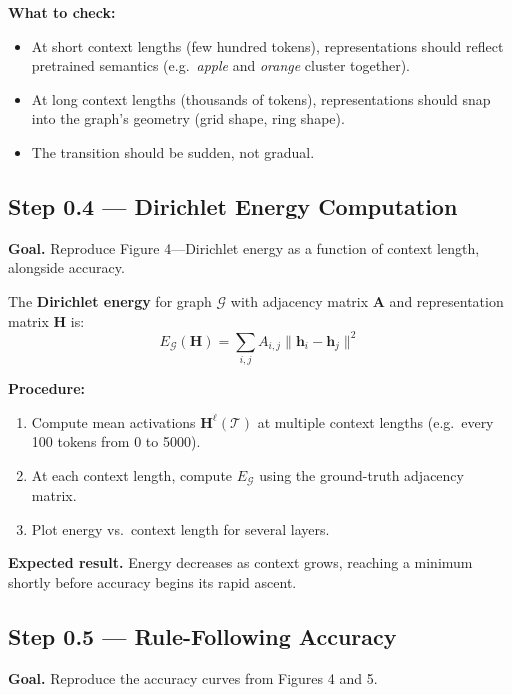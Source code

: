 \documentclass[11pt]{article}
\newcommand{\vH}{\mathbf{H}}
\newcommand{\vh}{\mathbf{h}}
\newcommand{\vA}{\mathbf{A}}
\newcommand{\cG}{\mathcal{G}}
\newcommand{\cT}{\mathcal{T}}
\begin{document}
\textbf{What to check:}
\begin{itemize}
    \item At short context lengths (few hundred tokens), representations should reflect pretrained semantics (e.g.\ \emph{apple} and \emph{orange} cluster together).
    \item At long context lengths (thousands of tokens), representations should snap into the graph's geometry (grid shape, ring shape).
    \item The transition should be sudden, not gradual.
\end{itemize}

\subsection{Step 0.4 --- Dirichlet Energy Computation}

\textbf{Goal.} Reproduce Figure 4---Dirichlet energy as a function of context length, alongside accuracy.

The \textbf{Dirichlet energy} for graph $\cG$ with adjacency matrix $\vA$ and representation matrix $\vH$ is:
\begin{equation}
    E_\cG(\vH) = \sum_{i,j} A_{i,j} \| \vh_i - \vh_j \|^2
    \label{eq:dirichlet}
\end{equation}

\textbf{Procedure:}
\begin{enumerate}
    \item Compute mean activations $\vH^\ell(\cT)$ at multiple context lengths (e.g.\ every 100 tokens from 0 to 5000).
    \item At each context length, compute $E_\cG$ using the ground-truth adjacency matrix.
    \item Plot energy vs.\ context length for several layers.
\end{enumerate}

\textbf{Expected result.} Energy decreases as context grows, reaching a minimum shortly before accuracy begins its rapid ascent.

\subsection{Step 0.5 --- Rule-Following Accuracy}

\textbf{Goal.} Reproduce the accuracy curves from Figures 4 and 5.
\end{document}

